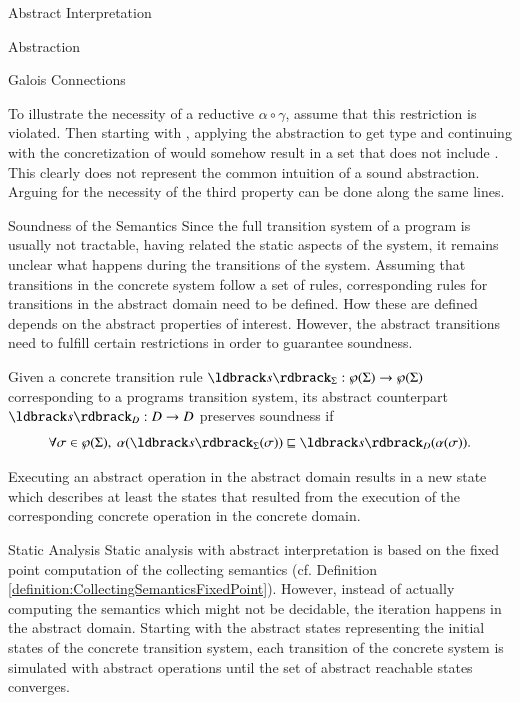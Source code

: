 \begin{chapter}{Abstract Interpretation}
\begin{section}{Abstraction}
\begin{subsection}{Galois Connections}
\begin{example}
				To illustrate the necessity of a reductive $\alpha \circ \gamma$, assume that this restriction is violated. Then starting with , applying the abstraction to get type  and continuing with the concretization of  would somehow result in a set that does not include . This clearly does not represent the common intuition of a sound abstraction. Arguing for the necessity of the third property can be done along the same lines.
				\exampleend
			\end{example}
		\end{subsection}


		\begin{subsection}{Soundness of the Semantics}
			Since the full transition system of a program is usually not tractable, having related the static aspects of the system, it remains unclear what happens during the transitions of the system. Assuming that transitions in the concrete system follow a set of rules, corresponding rules for transitions in the abstract domain need to be defined. How these are defined depends on the abstract properties of interest. However, the abstract transitions need to fulfill certain restrictions in order to guarantee soundness.

			\begin{definition}
				\label{definition:soundnessofabstractoperations}
				Given a concrete transition rule $\ldbrack s \rdbrack_\Sigma: \wp(\Sigma) \to \wp(\Sigma)$ corresponding to a programs transition system, its abstract counterpart $\ldbrack s \rdbrack_D: D \to D$ preserves soundness if
				\begin{equation}
					\forall \sigma \in \wp(\Sigma), \ \alpha(\ldbrack s \rdbrack_\Sigma(\sigma)) \sqsubseteq \ldbrack s \rdbrack_D(\alpha(\sigma)).
				\end{equation}
			\end{definition}

			Executing an abstract operation in the abstract domain results in a new state which describes at least the states that resulted from the execution of the corresponding concrete operation in the concrete domain.
		\end{subsection}
	\end{section}

	\begin{section}{Static Analysis}
		\label{section:StaticAnalysis}
		Static analysis with abstract interpretation is based on the fixed point computation of the collecting semantics (cf. Definition \ref{definition:CollectingSemanticsFixedPoint}). However, instead of actually computing the semantics which might not be decidable, the iteration happens in the abstract domain. Starting with the abstract states representing the initial states of the concrete transition system, each transition of the concrete system is simulated with abstract operations until the set of abstract reachable states converges.


\end{section}
\end{chapter}
